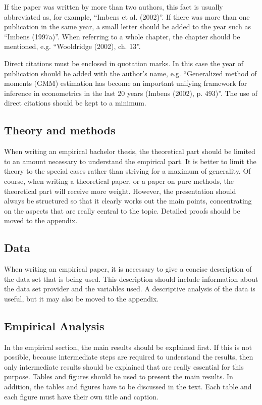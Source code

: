 \documentclass[12pt,a4paper]{article}
\begin{document}
If the paper was written by more than two authors, this fact
is usually abbreviated as, for example, ``Imbens et al. (2002)''.
If there was more than one publication in the same year, a small letter should be added to
the year such as ``Imbens (1997a)''. When referring to a whole
chapter, the chapter should be mentioned, e.g. ``Wooldridge (2002),
ch. 13''.

Direct citations must be enclosed in quotation marks. In
this case the year of publication should be added with the author's
name, e.g. ``Generalized method of moments (GMM) estimation has
become an important unifying framework for inference in econometrics
in the last 20 years (Imbens (2002), p. 493)''. The use of direct
citations should be kept to a minimum.

\subsection{Theory and methods}
When writing an empirical bachelor thesis, the theoretical part should be
limited to an amount necessary to understand the empirical part. It
is better to limit the theory to the special cases rather
than striving for a maximum of generality. Of course,
when writing a theoretical paper, or a paper on pure methods,
the theoretical part will receive more weight. However,
the presentation should always be structured so that it clearly
works out the main points, concentrating on the aspects
that are really central to the topic. Detailed proofs should be moved
to the appendix.


\subsection{Data}

When writing an empirical paper, it is necessary to give a
concise description of the data set that is being used. This description
should include information about the data set provider and
the variables used. A descriptive analysis of the data is useful, but it may also be
moved to the appendix.

\subsection{Empirical Analysis}

In the empirical section, the main results should be
explained first. If this is not possible, because intermediate steps
are required to understand the results, then only
intermediate results should be explained that are really essential
for this purpose.  Tables and figures should be used to present
the main results. In addition, the tables and figures have to be
discussed in the text. Each table and each figure must have
their own title and caption.
\end{document}

